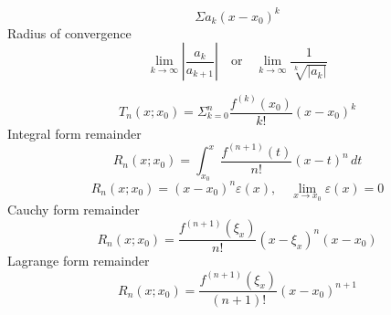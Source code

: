 \documentclass[10pt,landscape,a4paper]{article}
\newenvironment{topic}[1]
{\begin{mdframed}[
    linecolor=black,
    frametitle=#1,
    frametitlebackgroundcolor=black!5,
  ]}
{\end{mdframed}}
\newcommand{\dx}[1][x]{\,d#1}
\newcommand{\inftylim}[1]{\lim_{#1 \rightarrow \infty}}
\begin{document}
\begin{multicols}{3}
  \begin{topic}{Power series}{
      \[
        \Sigma a_k (x - x_0)^k
      \]
      Radius of convergence
      \[
        \inftylim{k} \left| \frac{a_k}{a_{k+1}} \right|
        \quad\text{or}\quad
        \inftylim{k} \frac{1}{\sqrt[k]{|a_k|}}
      \]
  }\end{topic}

  \begin{topic}{Taylor's theorem}{
      \[
        T_n(x; x_0) = \Sigma_{k=0}^n \frac{f^{(k)}(x_0)}{k!} (x-x_0)^k
      \]
      Integral form remainder
      \[
        R_n(x; x_0)
        = \int_{x_0}^x \frac{f^{(n+1)}(t)}{n!} (x-t)^n \dx[t]
      \]
      \[
        R_n(x; x_0) = (x - x_0)^n \varepsilon(x),
        \quad \lim_{x \rightarrow x_0} \varepsilon(x) = 0
      \]
      Cauchy form remainder
      \[
        R_n(x; x_0)
        = \frac{ f^{(n+1)}(\xi_x) }{n!} (x - \xi_x)^n (x - x_0)
      \]
      Lagrange form remainder
      \[
        R_n(x; x_0)
        = \frac{ f^{(n+1)}(\xi_x) }{ (n + 1)! } (x - x_0)^{n+1}
      \]
  }\end{topic}

\end{multicols}
\end{document}
